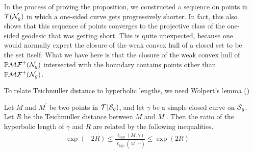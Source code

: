 \documentclass[12pt, reqno]{amsart}
\begin{document}
\begin{remark}
  In the process of proving the proposition, we constructed a sequence on points in $\mathcal{T}(\mathcal{N}_g)$ in which a one-sided curve gets progressively shorter.
  In fact, this also shows that this sequence of points converges to the projective class of the one-sided geodesic that was getting short.
  This is quite unexpected, because one would normally expect the closure of the weak convex hull of a closed set to be the set itself.
  What we have here is that the closure of the weak convex hull of $\mathbb{P}\mathcal{MF}^+(\mathcal{N}_g)$ intersected with the boundary contains points other than $\mathbb{P}\mathcal{MF}^+(\mathcal{N}_g)$.
\end{remark}

To relate Teichm\"uller distance to hyperbolic lengths, we need Wolpert's lemma (\autocite{wolpert1979length})
\begin{lemma}
  Let $M$ and $M^{\prime}$ be two points in $\mathcal{T}(\mathcal{S}_g)$, and let $\gamma$ be a simple closed curve on $\mathcal{S}_g$.
  Let $R$ be the Teichm\"uller distance between $M$ and $M^{\prime}$. Then the ratio of the hyperbolic length
  of $\gamma$ and $R$ are related by the following inequalities.
  \begin{align*}
    \exp(-2R) \leq \frac{\ell_{\mathrm{hyp}}(M, \gamma)}{\ell_{\mathrm{hyp}}(M^{\prime}, \gamma)} \leq \exp(2R)
  \end{align*}
\end{lemma}
\end{document}

